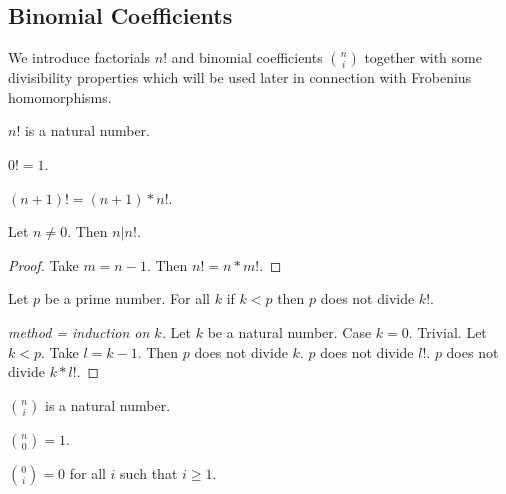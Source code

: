 \documentclass[english,11pt]{article}
\begin{document}
\subsection{Binomial Coefficients}

\newcommand{\cho}[2]{{#1 \choose #2}}

We introduce factorials $n!$ and binomial coefficients
$\cho{n}{i}$ together with some divisibility properties
which will be used later in connection with
Frobenius homomorphisms.

\newcommand{\fac}[1]{#1 !}

\begin{forthel}

\begin{signature}
$\fac{n}$ is a natural number.
\end{signature}

\begin{axiom}
$\fac{0} = 1$.
\end{axiom}

\begin{axiom}
$\fac{(n+1)} = (n+1) * \fac{n}$.
\end{axiom}

\begin{lemma} Let $n \neq 0$. Then $n | \fac{n}$.
\end{lemma}
\begin{proof}
Take $m = n - 1$.
Then $\fac{n} = n * \fac{m}$.
\end{proof}

\begin{lemma}
Let $p$ be a prime number.
For all $k$ if $k < p$ then $p$ does not divide $\fac{k}$.
\end{lemma}
\begin{proof}[method = induction on $k$]
Let $k$ be a natural number.
Case $k = 0$. Trivial.
Let $k < p$.
Take $l = k - 1$.
Then $p$ does not divide $k$. $p$ does not divide $\fac{l}$.
$p$ does not divide $k * \fac{l}$.
\end{proof}

\begin{signature}
$\cho{n}{i}$ is a natural number.
\end{signature}

\begin{axiom}
$\cho{n}{0} = 1$.
\end{axiom}

\begin{axiom}
$\cho{0}{i} = 0$ for all $i$ such that $i \geq 1$.
\end{axiom}


\end{forthel}
\end{document}
